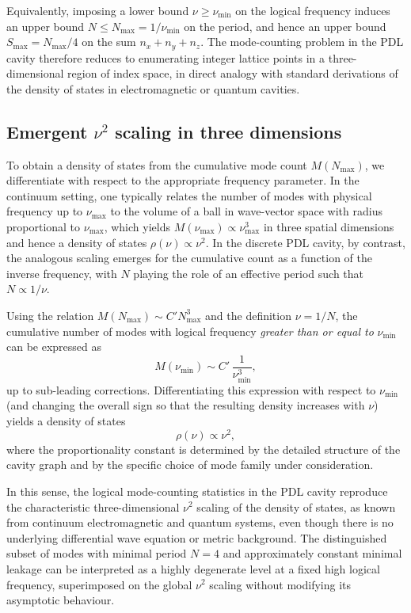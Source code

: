 \documentclass{article}
\theoremstyle{definition}
\begin{document}
Equivalently, imposing a lower bound $\nu \ge \nu_{\min}$ on the logical frequency induces an upper bound $N \le N_{\max} = 1/\nu_{\min}$ on the period, and hence an upper bound $S_{\max} = N_{\max}/4$ on the sum $n_x+n_y+n_z$.\cite{Density_of_states_Notes} The mode-counting problem in the PDL cavity therefore reduces to enumerating integer lattice points in a three-dimensional region of index space, in direct analogy with standard derivations of the density of states in electromagnetic or quantum cavities.\cite{Density_of_states_Notes,EM_Cavities_Notes,Counting_States_2021}

\subsection{Emergent \texorpdfstring{$\nu^2$}{nu\^2} scaling in three dimensions}

To obtain a density of states from the cumulative mode count $M(N_{\max})$, we differentiate with respect to the appropriate frequency parameter. In the continuum setting, one typically relates the number of modes with physical frequency up to $\nu_{\max}$ to the volume of a ball in wave-vector space with radius proportional to $\nu_{\max}$, which yields $M(\nu_{\max}) \propto \nu_{\max}^3$ in three spatial dimensions and hence a density of states $\rho(\nu) \propto \nu^2$.\cite{Density_of_states_Notes,EM_Cavities_Notes} In the discrete PDL cavity, by contrast, the analogous scaling emerges for the cumulative count as a function of the inverse frequency, with $N$ playing the role of an effective period such that $N \propto 1/\nu$.

Using the relation $M(N_{\max}) \sim C' N_{\max}^3$ and the definition $\nu = 1/N$, the cumulative number of modes with logical frequency \emph{greater than or equal to} $\nu_{\min}$ can be expressed as
\[
M(\nu_{\min}) \sim C' \, \frac{1}{\nu_{\min}^3},
\]
up to sub-leading corrections.\cite{Density_of_states_Notes} Differentiating this expression with respect to $\nu_{\min}$ (and changing the overall sign so that the resulting density increases with $\nu$) yields a density of states
\[
\rho(\nu) \propto \nu^2,
\]
where the proportionality constant is determined by the detailed structure of the cavity graph and by the specific choice of mode family under consideration.\cite{Density_of_states_Notes,EM_Cavities_Notes}

In this sense, the logical mode-counting statistics in the PDL cavity reproduce the characteristic three-dimensional $\nu^2$ scaling of the density of states, as known from continuum electromagnetic and quantum systems, even though there is no underlying differential wave equation or metric background.\cite{PDL_Main_2026,PDL_Position_2026} The distinguished subset of modes with minimal period $N=4$ and approximately constant minimal leakage can be interpreted as a highly degenerate level at a fixed high logical frequency, superimposed on the global $\nu^2$ scaling without modifying its asymptotic behaviour.\cite{Effective_Fields_PDL_2026}
\end{document}
